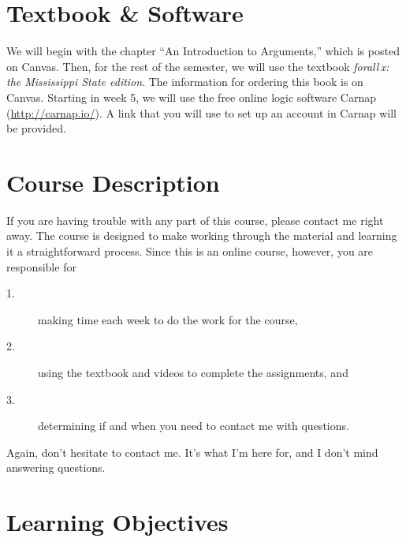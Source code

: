 \documentclass[11pt,oneside]{article}
\begin{document}




\section{Textbook \& Software}

We will begin with the chapter ``An Introduction to Arguments,'' which is posted on Canvas. Then, for the rest of the semester, we will use the textbook \textit{forall\,x: the Mississippi State edition}. The information for ordering this book is on Canvas. Starting in week 5, we will use the free online logic software Carnap (\url{http://carnap.io/}). A link that you will use to set up an account in Carnap will be provided. 


\section{Course Description}



If you are having trouble with any part of this course, please contact me right away. The course is designed to make working through the material and learning it a straightforward process. Since this is an online course, however, you are responsible for 
\begin{description}
\item[1.] making time each week to do the work for the course, 
\item[2.] using the textbook and videos to complete the assignments, and 
\item[3.] determining if and when you need to contact me with questions. 
\end{description}
Again, don’t hesitate to contact me. It’s what I’m here for, and I don’t mind answering questions.


\section{Learning Objectives}
\end{document}
